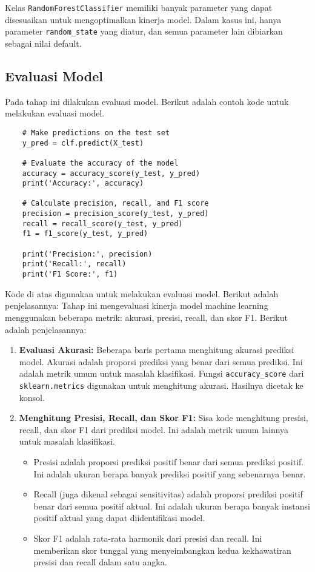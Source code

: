Kelas \texttt{RandomForestClassifier} memiliki banyak parameter yang dapat disesuaikan untuk mengoptimalkan kinerja model. Dalam kasus ini, hanya parameter \texttt{random\_state} yang diatur, dan semua parameter lain dibiarkan sebagai nilai default.

\subsection{Evaluasi Model}
Pada tahap ini dilakukan evaluasi model. Berikut adalah contoh kode untuk melakukan evaluasi model.
\begin{lstlisting}
    # Make predictions on the test set
    y_pred = clf.predict(X_test)
    
    # Evaluate the accuracy of the model
    accuracy = accuracy_score(y_test, y_pred)
    print('Accuracy:', accuracy)
    
    # Calculate precision, recall, and F1 score
    precision = precision_score(y_test, y_pred)
    recall = recall_score(y_test, y_pred)
    f1 = f1_score(y_test, y_pred)
    
    print('Precision:', precision)
    print('Recall:', recall)
    print('F1 Score:', f1)
\end{lstlisting}

Kode di atas digunakan untuk melakukan evaluasi model. Berikut adalah penjelasannya:
Tahap ini mengevaluasi kinerja model machine learning menggunakan beberapa metrik: akurasi, presisi, recall, dan skor F1. Berikut adalah penjelasannya:

\begin{enumerate}
\item \textbf{Evaluasi Akurasi:} Beberapa baris pertama menghitung akurasi prediksi model. Akurasi adalah proporsi prediksi yang benar dari semua prediksi. Ini adalah metrik umum untuk masalah klasifikasi. Fungsi \texttt{accuracy\_score} dari \texttt{sklearn.metrics} digunakan untuk menghitung akurasi. Hasilnya dicetak ke konsol.
\item \textbf{Menghitung Presisi, Recall, dan Skor F1:} Sisa kode menghitung presisi, recall, dan skor F1 dari prediksi model. Ini adalah metrik umum lainnya untuk masalah klasifikasi.
   \begin{itemize}
   \item Presisi adalah proporsi prediksi positif benar dari semua prediksi positif. Ini adalah ukuran berapa banyak prediksi positif yang sebenarnya benar.
   \item Recall (juga dikenal sebagai sensitivitas) adalah proporsi prediksi positif benar dari semua positif aktual. Ini adalah ukuran berapa banyak instansi positif aktual yang dapat diidentifikasi model.
   \item Skor F1 adalah rata-rata harmonik dari presisi dan recall. Ini memberikan skor tunggal yang menyeimbangkan kedua kekhawatiran presisi dan recall dalam satu angka.
   \end{itemize}
\end{enumerate}

